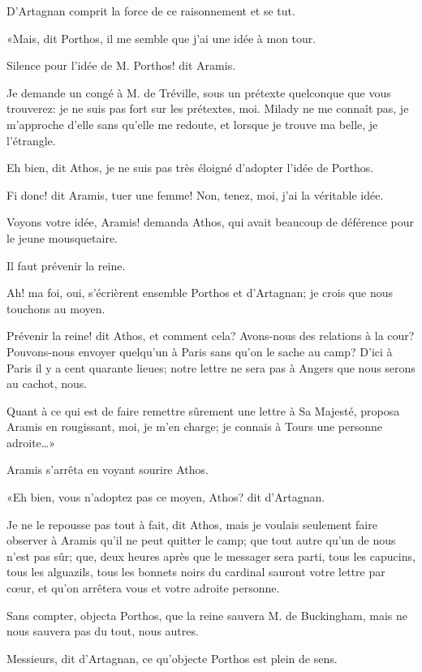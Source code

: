 D'Artagnan comprit la force de ce raisonnement et se tut. 

«Mais, dit Porthos, il me semble que j'ai une idée à mon tour. 

\speak  Silence pour l'idée de M. Porthos! dit Aramis. 

\speak  Je demande un congé à M. de Tréville, sous un prétexte quelconque que vous trouverez: je ne suis pas fort sur les prétextes, moi. Milady ne me connaît pas, je m'approche d'elle sans qu'elle me redoute, et lorsque je trouve ma belle, je l'étrangle. 

\speak  Eh bien, dit Athos, je ne suis pas très éloigné d'adopter l'idée de Porthos. 

\speak  Fi donc! dit Aramis, tuer une femme! Non, tenez, moi, j'ai la véritable idée. 

\speak  Voyons votre idée, Aramis! demanda Athos, qui avait beaucoup de déférence pour le jeune mousquetaire. 

\speak  Il faut prévenir la reine. 

\speak  Ah! ma foi, oui, s'écrièrent ensemble Porthos et d'Artagnan; je crois que nous touchons au moyen. 

\speak  Prévenir la reine! dit Athos, et comment cela? Avons-nous des relations à la cour? Pouvons-nous envoyer quelqu'un à Paris sans qu'on le sache au camp? D'ici à Paris il y a cent quarante lieues; notre lettre ne sera pas à Angers que nous serons au cachot, nous. 

\speak  Quant à ce qui est de faire remettre sûrement une lettre à Sa Majesté, proposa Aramis en rougissant, moi, je m'en charge; je connais à Tours une personne adroite\dots» 

Aramis s'arrêta en voyant sourire Athos. 

«Eh bien, vous n'adoptez pas ce moyen, Athos? dit d'Artagnan. 

\speak  Je ne le repousse pas tout à fait, dit Athos, mais je voulais seulement faire observer à Aramis qu'il ne peut quitter le camp; que tout autre qu'un de nous n'est pas sûr; que, deux heures après que le messager sera parti, tous les capucins, tous les alguazils, tous les bonnets noirs du cardinal sauront votre lettre par cœur, et qu'on arrêtera vous et votre adroite personne. 

\speak  Sans compter, objecta Porthos, que la reine sauvera M. de Buckingham, mais ne nous sauvera pas du tout, nous autres. 

\speak  Messieurs, dit d'Artagnan, ce qu'objecte Porthos est plein de sens. 

